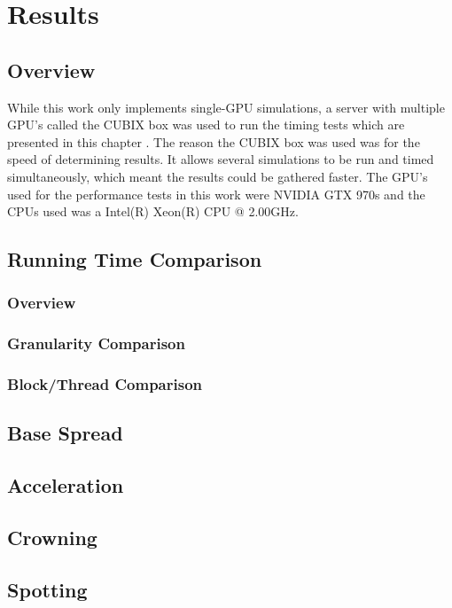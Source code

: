\chapter{Results}
\label{chapter:results}

\section{Overview}
While this work only implements single-GPU simulations, a server with multiple GPU's called the CUBIX box was used to run the timing tests which are presented in this chapter \cite{cubix}. The reason the CUBIX box was used was for the speed of determining results. It allows several simulations to be run and timed simultaneously, which meant the results could be gathered faster. The GPU's used for the performance tests in this work were NVIDIA GTX 970s and the CPUs used was a Intel(R) Xeon(R) CPU @ 2.00GHz. 

\section{Running Time Comparison}
\subsection{Overview}
\subsection{Granularity Comparison}
\subsection{Block/Thread Comparison}


\section{Base Spread}

\section{Acceleration}

\section{Crowning}

\section{Spotting}